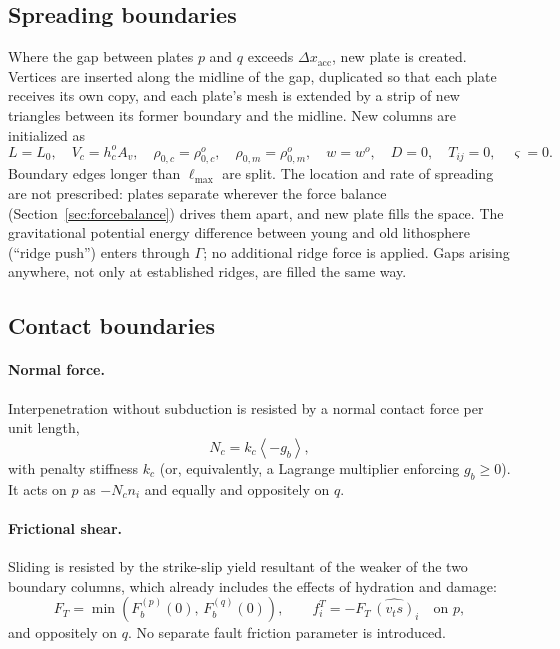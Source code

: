 \documentclass[11pt]{article}
\newcommand{\mac}[1]{\left\langle #1 \right\rangle}
\begin{document}
\subsection{Spreading boundaries}
\label{sec:spreading}

Where the gap between plates $p$ and $q$ exceeds $\Delta x_{\mathrm{acc}}$, new
plate is created. Vertices are inserted along the midline of the gap,
duplicated so that each plate receives its own copy, and each plate's mesh is
extended by a strip of new triangles between its former boundary and the
midline. New columns are initialized as
\begin{equation}
  L = L_0,\quad
  V_c = h_c^{o}A_v,\quad
  \rho_{0,c} = \rho_{0,c}^{o},\quad
  \rho_{0,m} = \rho_{0,m}^{o},\quad
  w = w^{o},\quad
  D = 0,\quad
  T_{ij} = 0,\quad
  \varsigma = 0.
\end{equation}
Boundary edges longer than $\ell_{\max}$ are split. The location and rate of
spreading are not prescribed: plates separate wherever the force balance
(Section~\ref{sec:forcebalance}) drives them apart, and new plate fills the
space. The gravitational potential energy difference between young and old
lithosphere (``ridge push'') enters through $\Gamma$; no additional ridge force
is applied. Gaps arising anywhere, not only at established ridges, are filled
the same way.

\subsection{Contact boundaries}
\label{sec:contact}

\paragraph{Normal force.}
Interpenetration without subduction is resisted by a normal contact force per
unit length,
\begin{equation}
  N_c = k_c \mac{-g_b},
\end{equation}
with penalty stiffness $k_c$ (or, equivalently, a Lagrange multiplier enforcing
$g_b \ge 0$). It acts on $p$ as $-N_c n_i$ and equally and oppositely on $q$.

\paragraph{Frictional shear.}
Sliding is resisted by the strike-slip yield resultant of the weaker of the two
boundary columns, which already includes the effects of hydration and damage:
\begin{equation}
  F_T = \min\left(F_b^{(p)}(0),\,F_b^{(q)}(0)\right),
  \qquad
  f^{T}_i = -F_T\,\widehat{(v_t s)}_i \quad \text{on } p,
\end{equation}
and oppositely on $q$. No separate fault friction parameter is introduced.
\end{document}
